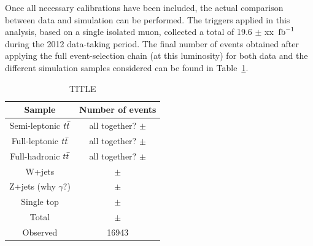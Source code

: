 Once all necessary calibrations have been included, the actual comparison between data and simulation can be performed.
The triggers applied in this analysis, based on a single isolated muon, collected a total of 19.6 $\pm$ xx $\, \mathrm{fb}^{-1}$ during the 2012 data-taking period.
The final number of events obtained after applying the full event-selection chain (at this luminosity) for both data and the different simulation samples considered can be found in Table~\ref{table::DataMCComp}.
\begin{table}[h!t]
 \caption{TITLE} \label{table::DataMCComp}
 \centering
 \begin{tabular}{c|c}
  \hline
  Sample 			& Number of events 	\\
  \hline
  \hline
  Semi-leptonic $t\bar{t}$ 	& all together? $\pm$ 		\\
  Full-leptonic $t\bar{t}$ 	& all together? $\pm$ 		\\
  Full-hadronic $t\bar{t}$ 	& all together? $\pm$ 		\\
  W+jets 			&  $\pm$ 			\\
  Z+jets (why $\gamma$?)	&  $\pm$ 			\\
  Single top 			&  $\pm$ 			\\
  \hline
  Total				&  $\pm$ 			\\
  \hline
  \hline
  Observed			& 16943			\\
  \hline
 \end{tabular}
\end{table}

